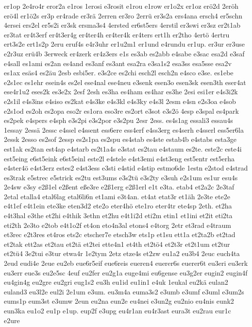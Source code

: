 {er1op
2e4ro4r
eror2a
e1ros
1erosi
e3rosit
e1rou
e1row
er1o2x
er1oz
erö2d
2eröh
erö4l
er1ö2s
er3p
er4rade
er3rä
2erren
er3ro
2errü
er3s2a
ers4ana
ersch4
er5schn
4ersei
ers2el
er5s2i
er3sk
ersma3s4
4ersted
er6st5ers
4erstil
er3swi
er3sz
er2t1ab
er3tat
er4t3erf
er4t3er4g
er4ter4h
er4ter4k
er4ters
ert1h
er2tho
4ertö
4ertru
ert3s2e
ert1s2p
2eru
eruf4s
e4r3uhr
er1u2m1
er1und
e4rundu
er1up.
er3ur
er3use
e2r3uz
erü4b
3erweck
er4zerk
er4z3ers
e1s
es3ab
es2abb
e4sabe
e3sac
esa2d
e3saf
e4sall
es1ami
es2an
es4and
es3anf
es3ant
esa2ra
e3sa1s2
esa3ss
esa5sse
esa2v
es1ax
esäs4
es2äu
2esb
esbi5er.
e3s2ce
es2chi
esch2l
esch2n
e4sco
e3se.
es1ebe
e2s1ec
es1ehr
esein4s
es2el
ese4nal
ese4neu
e3senk
esen3o
esen3sk
esen3th
eser4at
ese4r1u2
eses2k
es3e2x
2esf
2esh
es3ha
es4ham
es4har
es3he
2esi
esi1er
e4s3i2k
e2s1il
e4s3ins
e4siso
es2kat
e4s3ke
e4s3kl
e4s3ky
e4s3l
2esm
e4sn
e2s3oa
e4sob
e2s1od
es2oh
es2opa
eso2r
es1ora
eso3re
es2ort
e3sot
e3s2ö
4esp
e3spal
es4park
es2pek
e4spers
e4sph
e3s2pi
e3s2por
e3s2pu
2esr
2ess.
es4s1ag
essali3
essau4s
1essay
2essä
2essc
e4ssel
e4ssent
ess6ere
ess4erf
e4ss3erg
es4serh
e4sserl
ess5er6la
2essk
2esso
es2sof
2essp
es2s1pa
es2spu
es4stab
es4ste
estab4b
e4stabs
esta3ge
est1ak
es2tan
est4ap
e4starb
es2t1a4s
e3stat
es2tau
e4staum
es2te.
este2c
este4i
est5eing
e6st5eink
e6st5einl
este2l
e4stele
e4st3emi
e4st3eng
est5entr
est5erha
e4ster4ö
e4st3erz
estes2
e4st3ess
e3sti
e4stid
e4stip
estmo6de
1estn
e2stod
e4strad
es3trak
e5strec
e5strick
es2tu
est3ums
e3s2tü
e3s2ty
e3suh
e2s1um
es1ur
esu4s
2e4sw
e3sy
e2ß1el
e2ßent
eße3re
e2ß1erg
e2ß1erl
e1t
e3ta.
etab4
et2a2c
2e3taf
2etal
etalla4
etal6lag
etal6li6n
et1ami
e3t4an.
et4at
etat3r
et1äh
2e3te
ete2e
e4t1ef
e4t1ein
ete3ke
eten3d2
ete2o
eter4hö
ete1ro
eter4tr
ete4sp
2eth.
et2ha
e4t3hal
e3the
et2hi
e4thik
3ethn
et2hu
e4t1i2d
eti2m
etin1
et1ini
et2it
eti2ta
eti2th
2e3to
e2tob
e4t1o2f
et4on
eto4n3al
etons4
e4torg
2etr
et3rad
e4traum
et3rec
e2t3res
et4ros
ets2c
etscher7e
etsch3w
ets1p
et1su
ett1a
et2ta2b
et2tad
et2tak
ett2as
et2tau
et2tä
et2tei
ette4n1
et4th
et2tö4
et2t3r
et2t1um
et2tur
et2tü4
3e2tui
e3tur
etwa4r
1e2tym
2etz
etze4s
et2zw
eu1a2
eu3b4
2euc
euch4ta
2eud
eudi4e
2eue
eu2eb
eue6r5eif
eue6reis
eueren4
euerer6s
euerer6t
eu3eri
eu3erk
eu3err
eue3s
eu2e5sc
4euf
eu2fer
eu2g1a
euge4mi
eu6gense
eu3g2er
eugin2
eugin4f
eu4gin4g
eu2gre
eu2gri
eug1s2
eu3h
eu1id
eu1in1
e4uk
1eukal
eu2kä
eulan2
euland3
eu3l2e
eul2i
2e1um
e3um.
eu3m4a
euma3s2
e3umb
e3umf
e3uml
e3um2s
eums1p
eum3st
e3umw
2eun
eu2na
eun2e
eu4nei
e3un2g
eu2nio
eu4nis
eunk2
eun3ka
eu1o2
eu1p
e1up.
eup2f
e3upg
eu4r1an
eu4r3ast
eura3t
eu2rau
eur1c
e2ure
}
